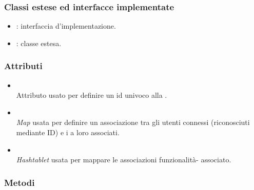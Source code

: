 \subsubsection*{Classi estese ed interfacce implementate}

\begin{itemize}
	\item {}: interfaccia d'implementazione.
	\item {}: classe estesa.
\end{itemize}

\subsubsection*{Attributi}

\begin{itemize}
	\item{}\\
	Attributo usato per definire un id univoco alla .
	\item{}\\
	\textit{Map} usata per definire un associazione tra gli utenti connessi (riconosciuti mediante ID) e i  a loro associati.
	\item{}\\
	\textit{Hashtablet} usata per mappare le associazioni funzionalità- associato.
\end{itemize}

\subsubsection*{Metodi}

